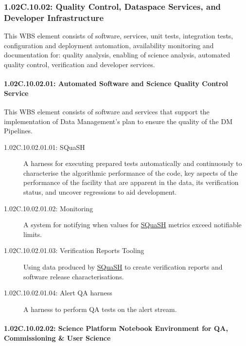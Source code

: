 \subsubsection*{1.02C.10.02: Quality Control, Dataspace Services, and Developer Infrastructure}

This WBS element consists of software, services, unit tests, integration tests, configuration and deployment automation, availability monitoring and documentation for: quality analysis, enabling of science analysis, automated quality control, verification and developer services.

\paragraph*{1.02C.10.02.01: Automated Software and Science Quality Control Service}
\label{wbs:1.02C.10.02.01}

This WBS element consists of software and services that support the
implementation of Data Management's plan to ensure the quality of the DM
Pipelines.

\begin{description}

\item[1.02C.10.02.01.01: SQuaSH]
  \label{wbs:1.02C.10.02.01.01}
  A harness for executing prepared tests automatically and continuously to
  characterise the algorithmic performance of the code, key aspects of the
  performance of the facility that are apparent in the data, its verification
  status, and uncover regressions to aid development.

\item[1.02C.10.02.01.02: Monitoring]
  A system for notifying when values for
  \hyperref[wbs:1.02C.10.02.01.01]{SQuaSH} metrics exceed notifiable limits.

\item[1.02C.10.02.01.03: Verification Reports Tooling]
  Using data produced by \hyperref[wbs:1.02C.10.02.01.01]{SQuaSH} to create
  verification reports and software release characterisations.

\item[1.02C.10.02.01.04: Alert QA harness]
  A harness to perform QA tests on the alert stream.

\end{description}

\paragraph*{1.02C.10.02.02: Science Platform Notebook Environment for QA, Commissioning \& User Science}

